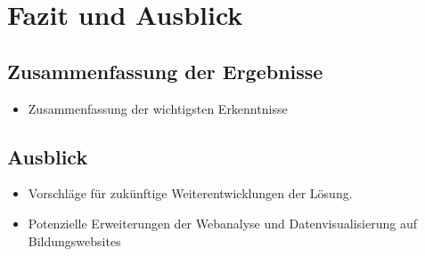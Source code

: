 

\chapter{Fazit und Ausblick}
\label{ch:zusammenfassung}

\section{Zusammenfassung der Ergebnisse}
\begin{itemize}
    \item Zusammenfassung der wichtigsten Erkenntnisse 
\end{itemize}

\section{Ausblick}
\begin{itemize}
    \item Vorschläge für zukünftige Weiterentwicklungen der Lösung.
    \item Potenzielle Erweiterungen der Webanalyse und Datenvisualisierung auf Bildungswebsites
\end{itemize}




